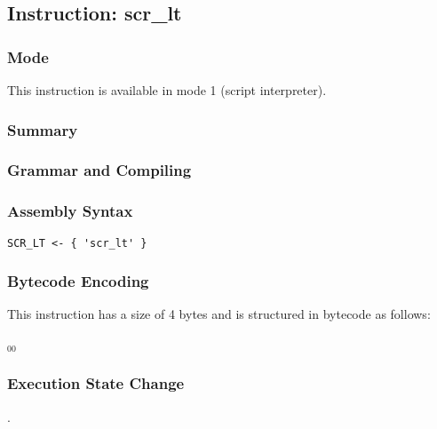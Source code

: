 \subsection{Instruction: scr\_lt}

\subsubsection{Mode}
This instruction is available in mode 1 (script interpreter).
\subsubsection{Summary}


\subsubsection{Grammar and Compiling}


\subsubsection{Assembly Syntax}

\begin{myquote}
\begin{verbatim}
SCR_LT <- { 'scr_lt' }
\end{verbatim}
\end{myquote}

\subsubsection{Bytecode Encoding}

This instruction has a size of 4 bytes and is structured in bytecode as follows:

$_{00}$\ 

\subsubsection{Execution State Change}

.


